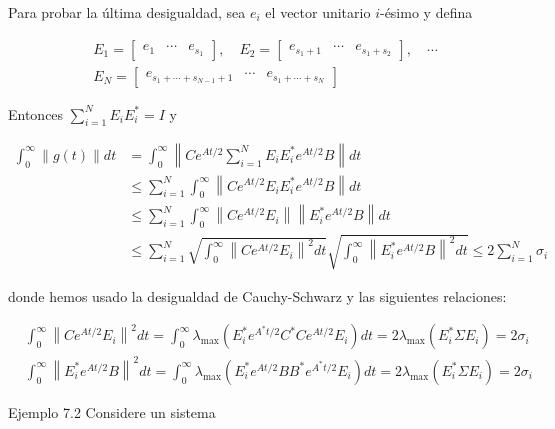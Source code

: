 Para probar la última desigualdad, sea $e_{i}$ el vector unitario $i$-ésimo y defina

$$
\begin{aligned}
& E_{1}=\left[\begin{array}{lll}
e_{1} & \cdots & e_{s_{1}}
\end{array}\right], \quad E_{2}=\left[\begin{array}{lll}
e_{s_{1}+1} & \cdots & e_{s_{1}+s_{2}}
\end{array}\right], \quad \cdots \\
& E_{N}=\left[\begin{array}{lll}
e_{s_{1}+\cdots+s_{N-1}+1} & \cdots & e_{s_{1}+\cdots+s_{N}}
\end{array}\right]
\end{aligned}
$$

Entonces $\sum_{i=1}^{N} E_{i} E_{i}^{*}=I$ y

$$
\begin{aligned}
\int_{0}^{\infty}\|g(t)\| d t & =\int_{0}^{\infty}\left\|C e^{A t / 2} \sum_{i=1}^{N} E_{i} E_{i}^{*} e^{A t / 2} B\right\| d t \\
& \leq \sum_{i=1}^{N} \int_{0}^{\infty}\left\|C e^{A t / 2} E_{i} E_{i}^{*} e^{A t / 2} B\right\| d t \\
& \leq \sum_{i=1}^{N} \int_{0}^{\infty}\left\|C e^{A t / 2} E_{i}\right\|\left\|E_{i}^{*} e^{A t / 2} B\right\| d t \\
& \leq \sum_{i=1}^{N} \sqrt{\int_{0}^{\infty}\left\|C e^{A t / 2} E_{i}\right\|^{2} d t} \sqrt{\int_{0}^{\infty}\left\|E_{i}^{*} e^{A t / 2} B\right\|^{2} d t} \leq 2 \sum_{i=1}^{N} \sigma_{i}
\end{aligned}
$$

donde hemos usado la desigualdad de Cauchy-Schwarz y las siguientes relaciones:

$$
\begin{aligned}
& \int_{0}^{\infty}\left\|C e^{A t / 2} E_{i}\right\|^{2} d t=\int_{0}^{\infty} \lambda_{\max }\left(E_{i}^{*} e^{A^{*} t / 2} C^{*} C e^{A t / 2} E_{i}\right) d t=2 \lambda_{\max }\left(E_{i}^{*} \Sigma E_{i}\right)=2 \sigma_{i} \\
& \int_{0}^{\infty}\left\|E_{i}^{*} e^{A t / 2} B\right\|^{2} d t=\int_{0}^{\infty} \lambda_{\max }\left(E_{i}^{*} e^{A t / 2} B B^{*} e^{A^{*} t / 2} E_{i}\right) d t=2 \lambda_{\max }\left(E_{i}^{*} \Sigma E_{i}\right)=2 \sigma_{i}
\end{aligned}
$$

Ejemplo 7.2 Considere un sistema

